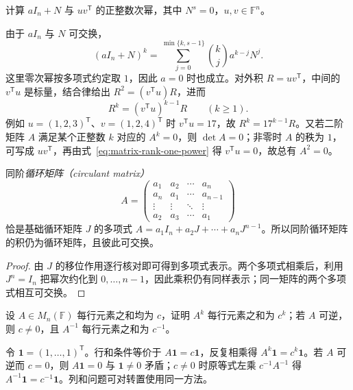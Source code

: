 \begin{example}
\label{ex:matrix-powers}
计算 $aI_n+N$ 与 $uv^{\mathsf T}$ 的正整数次幂，其中 $N^s=0$，$u,v\in\mathbb F^n$。
\end{example}
\begin{solve}
由于 $aI_n$ 与 $N$ 可交换，
\begin{equation}
 (aI_n+N)^k=\sum_{j=0}^{\min\{k,s-1\}}\binom{k}{j}a^{k-j}N^j.
 \label{eq:matrix-nilpotent-power}
\end{equation}
这里零次幂按多项式约定取 $1$，因此 $a=0$ 时也成立。对外积 $R=uv^{\mathsf T}$，中间的 $v^{\mathsf T}u$ 是标量，结合律给出 $R^2=(v^{\mathsf T}u)R$，进而
\begin{equation}
 R^k=(v^{\mathsf T}u)^{k-1}R\qquad(k\ge1).
 \label{eq:matrix-rank-one-power}
\end{equation}
例如 $u=(1,2,3)^{\mathsf T}$、$v=(1,2,4)^{\mathsf T}$ 时 $v^{\mathsf T}u=17$，故 $R^k=17^{k-1}R$。又若二阶矩阵 $A$ 满足某个正整数 $k$ 对应的 $A^k=0$，则 $\det A=0$；非零时 $A$ 的秩为 $1$，可写成 $uv^{\mathsf T}$，再由式~\eqref{eq:matrix-rank-one-power} 得 $v^{\mathsf T}u=0$，故总有 $A^2=0$。
\end{solve}

\begin{proposition}
\label{prop:matrix-circulant-polynomial}
同阶\emph{循环矩阵（circulant matrix）}
\[
 A=\begin{pmatrix}
 a_1&a_2&\cdots&a_n\\
 a_n&a_1&\cdots&a_{n-1}\\
 \vdots&\vdots&\ddots&\vdots\\
 a_2&a_3&\cdots&a_1
 \end{pmatrix}
\]
恰是基础循环矩阵 $J$ 的多项式 $A=a_1I_n+a_2J+\cdots+a_nJ^{n-1}$。所以同阶循环矩阵的积仍为循环矩阵，且彼此可交换。
\end{proposition}
\begin{proof}
由 $J$ 的移位作用逐行核对即可得到多项式表示。两个多项式相乘后，利用 $J^n=I_n$ 把幂次约化到 $0,\ldots,n-1$，因此乘积仍有同样表示；同一矩阵的两个多项式相互可交换。
\end{proof}

\begin{example}
\label{ex:matrix-row-sums}
设 $A\in M_n(\mathbb F)$ 每行元素之和均为 $c$，证明 $A^k$ 每行元素之和为 $c^k$；若 $A$ 可逆，则 $c\ne0$，且 $A^{-1}$ 每行元素之和为 $c^{-1}$。
\end{example}
\begin{solve}
令 $\mathbf1=(1,\ldots,1)^{\mathsf T}$。行和条件等价于 $A\mathbf1=c\mathbf1$，反复相乘得 $A^k\mathbf1=c^k\mathbf1$。若 $A$ 可逆而 $c=0$，则 $A\mathbf1=0$ 与 $\mathbf1\ne0$ 矛盾；$c\ne0$ 时原等式左乘 $c^{-1}A^{-1}$ 得 $A^{-1}\mathbf1=c^{-1}\mathbf1$。列和问题可对转置使用同一方法。
\end{solve}

